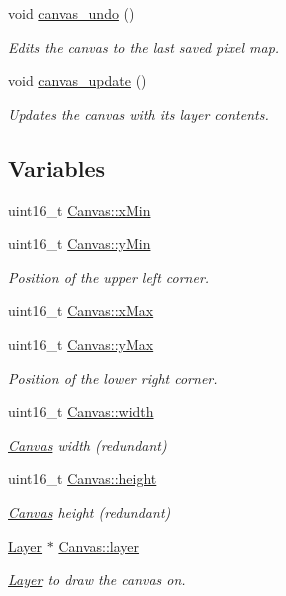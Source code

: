 \begin{DoxyCompactItemize}
void \mbox{\hyperlink{group__canvas_ga96be607ebdf4fda25a050f017d68db93}{canvas\+\_\+undo}} ()
\begin{DoxyCompactList}\small\item\em Edits the canvas to the last saved pixel map. \end{DoxyCompactList}\item 
void \mbox{\hyperlink{group__canvas_gab462a38a3f3a612931c008e28e816a8d}{canvas\+\_\+update}} ()
\begin{DoxyCompactList}\small\item\em Updates the canvas with its layer contents. \end{DoxyCompactList}\end{DoxyCompactItemize}
\subsection*{Variables}
\begin{DoxyCompactItemize}
\item 
uint16\+\_\+t \mbox{\hyperlink{group__canvas_ga10925446227a312ac91f903acaf074e8}{Canvas\+::x\+Min}}
\item 
uint16\+\_\+t \mbox{\hyperlink{group__canvas_ga91a71d5f9030202359d000a5fb54423a}{Canvas\+::y\+Min}}
\begin{DoxyCompactList}\small\item\em Position of the upper left corner. \end{DoxyCompactList}\item 
uint16\+\_\+t \mbox{\hyperlink{group__canvas_ga423c26269827a5beb80f569ba8076ae2}{Canvas\+::x\+Max}}
\item 
uint16\+\_\+t \mbox{\hyperlink{group__canvas_ga2990194f0baef3d23cb75299cc39987d}{Canvas\+::y\+Max}}
\begin{DoxyCompactList}\small\item\em Position of the lower right corner. \end{DoxyCompactList}\item 
uint16\+\_\+t \mbox{\hyperlink{group__canvas_gaee9a970b56d8660b35047a170abc58ca}{Canvas\+::width}}
\begin{DoxyCompactList}\small\item\em \mbox{\hyperlink{struct_canvas}{Canvas}} width (redundant) \end{DoxyCompactList}\item 
uint16\+\_\+t \mbox{\hyperlink{group__canvas_ga438a71c178c014aef3de261dbc7b483e}{Canvas\+::height}}
\begin{DoxyCompactList}\small\item\em \mbox{\hyperlink{struct_canvas}{Canvas}} height (redundant) \end{DoxyCompactList}\item 
\mbox{\hyperlink{struct_layer}{Layer}} $\ast$ \mbox{\hyperlink{group__canvas_gaf72f42e64c0a72256001acc241f287ce}{Canvas\+::layer}}
\begin{DoxyCompactList}\small\item\em \mbox{\hyperlink{struct_layer}{Layer}} to draw the canvas on. \end{DoxyCompactList}\end{DoxyCompactItemize}


